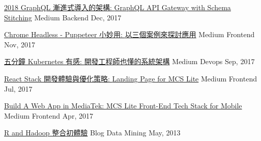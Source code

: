 \begin{cvhonors}

  \cvhonor
    {\href{https://medium.com/@evenchange4/2018-graphql-\%E6\%BC\%B8\%E9\%80\%B2\%E5\%BC\%8F\%E5\%B0\%8E\%E5\%85\%A5\%E7\%9A\%84\%E6\%9E\%B6\%E6\%A7\%8B-aeb2603f2223}{2018 GraphQL 漸進式導入的架構: \textmd{GraphQL API Gateway with Schema Stitching}}} %
    {Medium} %
    {Backend} %
    {Dec, 2017} %

  \cvhonor
    {\href{https://medium.com/@evenchange4/chrome-headless-puppeteer-\%E5\%B0\%8F\%E5\%A6\%99\%E7\%94\%A8-9ac2c3b4e761}{Chrome Headless - Puppeteer 小妙用: \textmd{以三個案例來探討應用}}} %
    {Medium} %
    {Frontend} %
    {Nov, 2017} %

  \cvhonor
    {\href{https://medium.com/@evenchange4/\%E4\%BA\%94\%E5\%88\%86\%E9\%90\%98-kubernetes-\%E6\%9C\%89\%E6\%84\%9F-e51f093cb10b}{五分鐘 Kubernetes 有感: \textmd{開發工程師也懂的系統架構}}} %
    {Medium} %
    {Devops} %
    {Sep, 2017} %

  \cvhonor
    {\href{https://medium.com/@evenchange4/react-stack-\%E9\%96\%8B\%E7\%99\%BC\%E9\%AB\%94\%E9\%A9\%97\%E8\%88\%87\%E5\%84\%AA\%E5\%8C\%96\%E7\%AD\%96\%E7\%95\%A5-b056da2fa0aa}{React Stack 開發體驗與優化策略: \textmd{Landing Page for MCS Lite}}} %
    {Medium} %
    {Frontend} %
    {Jul, 2017} %

  \cvhonor
    {\href{https://medium.com/@evenchange4/build-a-web-app-in-mediatek-61b0a26215a0}{Build A Web App in MediaTek: \textmd{MCS Lite Front-End Tech Stack for Mobile}}} %
    {Medium} %
    {Frontend} %
    {Apr, 2017} %

  \cvhonor
    {\href{https://old.michaelhsu.tw/2013/05/01/r-and-hadoop-\%E5\%88\%9D\%E9\%AB\%94\%E9\%A9\%97/}{R and Hadoop 整合初體驗}} %
    {Blog} %
    {Data Mining} %
    {May, 2013} %


\end{cvhonors}
